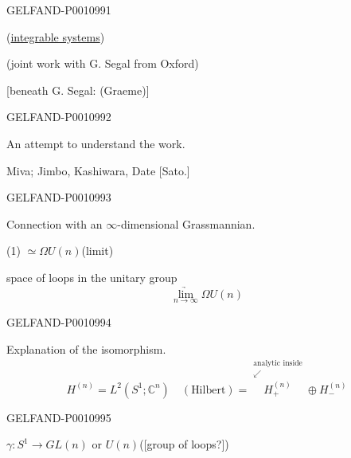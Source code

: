 \begin{GelfandAdjacentEvidence}{GELFAND-P001099}{1}
\begin{center}
\qquad(\underline{integrable systems})
\end{center}
(joint work with G. Segal from Oxford)

[beneath G. Segal: (Graeme)]

\end{GelfandAdjacentEvidence}
\begin{GelfandAdjacentEvidence}{GELFAND-P001099}{2}


An attempt to understand the work.

Miva; Jimbo, Kashiwara, Date [Sato.]
\end{GelfandAdjacentEvidence}
\begin{GelfandAdjacentEvidence}{GELFAND-P001099}{3}


Connection with an $\infty$-dimensional Grassmannian.

\begin{center}
(1)\quad{} $\simeq\Omega U(n)$\qquad(limit)
\end{center}
space of loops in the unitary group
\[
\underset{n\to\infty}{\underrightarrow{\lim}}\Omega U(n)
\]
\end{GelfandAdjacentEvidence}
\begin{GelfandAdjacentEvidence}{GELFAND-P001099}{4}


Explanation of the isomorphism.
\[
H^{(n)}=L^2(S^1;\mathbb C^n)\quad
(\text{Hilbert})=
\overset{\substack{\text{analytic inside}\\\swarrow}}{H_+^{(n)}}\oplus H_-^{(n)}
\]
\end{GelfandAdjacentEvidence}
\begin{GelfandAdjacentEvidence}{GELFAND-P001099}{5}


$\gamma:S^1\to GL(n)$ or $U(n)$\qquad([group of loops?])
\end{GelfandAdjacentEvidence}
